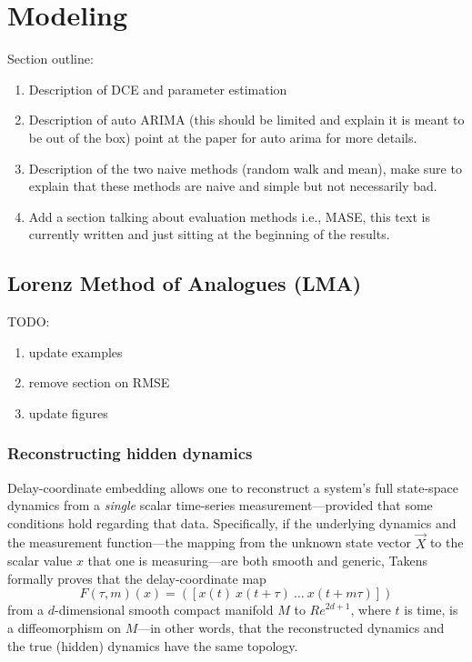 \section{Modeling}\label{sec:model}

Section outline:

\begin{enumerate}

\item Description of DCE and parameter estimation  
\item Description of auto ARIMA 
\subitem (this should be limited and explain it is meant to be out of the box) point at the paper for auto arima for more details.
\item Description of the two naive methods (random walk and mean), make sure to explain that these methods are naive and simple but not necessarily bad.
\item\cmark Add a section talking about evaluation methods i.e., MASE, this text is currently written and just sitting at the beginning of the results. 

\end{enumerate}

\subsection{Lorenz Method of Analogues (LMA)}
TODO:
\begin{enumerate}
\item update examples
\item remove section on RMSE
\item update figures
\end{enumerate}


 \subsubsection{Reconstructing hidden dynamics}



Delay-coordinate embedding allows one to reconstruct a system's full
state-space dynamics from a \emph{single} scalar time-series
measurement---provided that some conditions hold regarding that data.
Specifically, if the underlying dynamics and the measurement
function---the mapping from the unknown state vector $\vec{X}$ to the
scalar value $x$ that one is measuring---are both smooth and generic,
Takens~\cite{takens} formally proves that the delay-coordinate map
\[
F(\tau,m)(x) = ([x(t) ~ x(t+\tau) ~ \dots ~x(t+m\tau)])
\]
from a $d$-dimensional smooth compact manifold $M$ to ${Re}^{2d+1}$,
where $t$ is time, is a diffeomorphism on $M$---in other words, that
the reconstructed dynamics and the true (hidden) dynamics have the
same topology.


